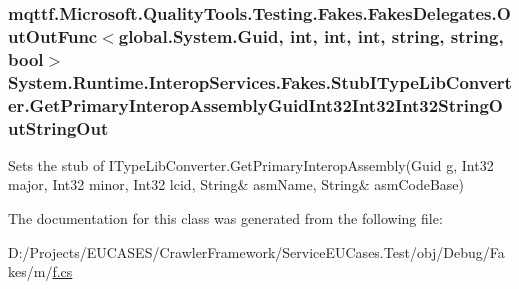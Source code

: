 \hypertarget{class_system_1_1_runtime_1_1_interop_services_1_1_fakes_1_1_stub_i_type_lib_converter_a9f2b70f8bc64fa3c020561f296498633}{
\subsubsection[{Get\-Primary\-Interop\-Assembly\-Guid\-Int32\-Int32\-Int32\-String\-Out\-String\-Out}]{\setlength{\rightskip}{0pt plus 5cm}mqttf.\-Microsoft.\-Quality\-Tools.\-Testing.\-Fakes.\-Fakes\-Delegates.\-Out\-Out\-Func$<$global.\-System.\-Guid, int, int, int, string, string, bool$>$ System.\-Runtime.\-Interop\-Services.\-Fakes.\-Stub\-I\-Type\-Lib\-Converter.\-Get\-Primary\-Interop\-Assembly\-Guid\-Int32\-Int32\-Int32\-String\-Out\-String\-Out}}\label{class_system_1_1_runtime_1_1_interop_services_1_1_fakes_1_1_stub_i_type_lib_converter_a9f2b70f8bc64fa3c020561f296498633}


Sets the stub of I\-Type\-Lib\-Converter.\-Get\-Primary\-Interop\-Assembly(Guid g, Int32 major, Int32 minor, Int32 lcid, String\& asm\-Name, String\& asm\-Code\-Base)



The documentation for this class was generated from the following file\-:\begin{DoxyCompactItemize}
\item 
D\-:/\-Projects/\-E\-U\-C\-A\-S\-E\-S/\-Crawler\-Framework/\-Service\-E\-U\-Cases.\-Test/obj/\-Debug/\-Fakes/m/\hyperlink{m_2f_8cs}{f.\-cs}\end{DoxyCompactItemize}
